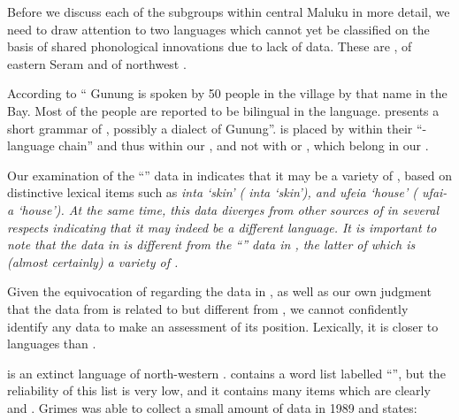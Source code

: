 Before we discuss each of the subgroups within central
Maluku in more detail,
we need to draw attention to two languages which
cannot yet be classified on the basis of shared phonological
innovations due to lack of data.
These are , of eastern Seram and  of northwest .

According to \citet[121f]{LoskiLoski1989} “ Gunung is
spoken by 50 people in the village by that name in the  Bay.
Most of the people are reported to be bilingual in the  language.
\citet{Tauern1931} presents a short grammar of ,
possibly a dialect of  Gunung”.
 is placed by \citet{LoskiLoski1989} within their “-
language chain” and thus within our ,
and not with  or ,
which belong in our .

Our examination of the ``'' data in \citet[128--139]{Tauern1931}
indicates that it may be a variety of ,
based on distinctive lexical items such as \it{inta} ‘skin’ (
\it{inta} ‘skin’), and \it{ufeia} ‘house’ ( \it{ufai-a} ‘house’).
At the same time,
this data diverges from other sources of  in several respects
indicating that it may indeed be a different language.
It is important to note that the data in \citet[128--139]{Tauern1931}
is different from the “” data in \citet{Stresemann1927},
the latter of which \it{is} (almost certainly) a variety of .

Given the equivocation of \citet{LoskiLoski1989} regarding the
data in \citet{Tauern1931}, as well as our own judgment that the data from \citet{Tauern1931}
is related to but different from ,
we cannot confidently identify any  data to make an assessment of its position.
Lexically, it is closer to  languages than .

 is an extinct language of north-western .
\citet[63--76]{Stokhof1982b} contains a word list labelled ``'',
but the reliability of this list is very low,
and it contains many items which are clearly  and .
Grimes was able to collect a small amount of data in 1989
and states:

